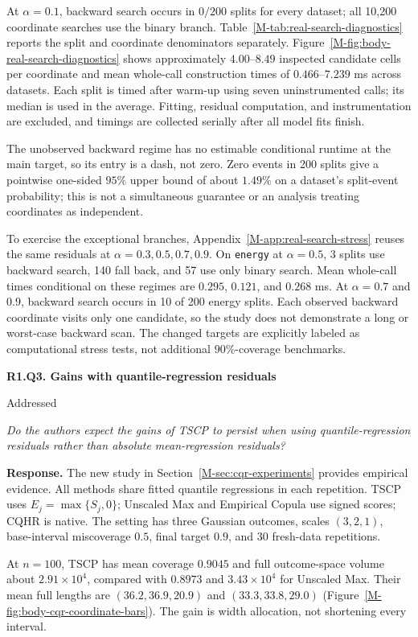\documentclass[11pt]{article}
\newcommand{\mssec}[1]{Section~\ref*{M-#1}}
\newcommand{\msapp}[1]{Appendix~\ref*{M-#1}}
\newcommand{\msfig}[1]{Figure~\ref*{M-#1}}
\newcommand{\mstab}[1]{Table~\ref*{M-#1}}
\newcommand{\point}[3]{\par\Needspace{7\baselineskip}\medskip
\noindent\parbox[t]{0.77\linewidth}{\textbf{#1}}\hfill
\parbox[t]{0.21\linewidth}{\raggedleft\small\sffamily #2}\par\nopagebreak
{\color{ReviewerBlue}\small\itshape #3\par}\textbf{Response.} }
\begin{document}
At $\alpha=0.1$, backward search occurs in $0/200$ splits for every dataset; all 10,200 coordinate searches use the binary branch. \mstab{tab:real-search-diagnostics} reports the split and coordinate denominators separately. \msfig{fig:body-real-search-diagnostics} shows approximately $4.00$--$8.49$ inspected candidate cells per coordinate and mean whole-call construction times of $0.466$--$7.239$ ms across datasets. Each split is timed after warm-up using seven uninstrumented calls; its median is used in the average. Fitting, residual computation, and instrumentation are excluded, and timings are collected serially after all model fits finish.

The unobserved backward regime has no estimable conditional runtime at the main target, so its entry is a dash, not zero. Zero events in 200 splits give a pointwise one-sided $95\%$ upper bound of about $1.49\%$ on a dataset's split-event probability; this is not a simultaneous guarantee or an analysis treating coordinates as independent.

To exercise the exceptional branches, \msapp{app:real-search-stress} reuses the same residuals at $\alpha=0.3,0.5,0.7,0.9$. On \texttt{energy} at $\alpha=0.5$, 3 splits use backward search, 140 fall back, and 57 use only binary search. Mean whole-call times conditional on these regimes are $0.295$, $0.121$, and $0.268$ ms. At $\alpha=0.7$ and $0.9$, backward search occurs in 10 of 200 energy splits. Each observed backward coordinate visits only one candidate, so the study does not demonstrate a long or worst-case backward scan. The changed targets are explicitly labeled as computational stress tests, not additional $90\%$-coverage benchmarks.

\point{R1.Q3. Gains with quantile-regression residuals}{Addressed}{Do the authors expect the gains of TSCP to persist when using
quantile-regression residuals rather than absolute mean-regression
residuals?}
\label{response:R1.Q3}
The new study in \mssec{sec:cqr-experiments} provides empirical evidence. All methods share fitted quantile regressions in each repetition. TSCP uses $E_j=\max\{S_j,0\}$; Unscaled Max and Empirical Copula use signed scores; CQHR is native. The setting has three Gaussian outcomes, scales $(3,2,1)$, base-interval miscoverage $0.5$, final target $0.9$, and 30 fresh-data repetitions.

At $n=100$, TSCP has mean coverage $0.9045$ and full outcome-space volume about $2.91\times10^4$, compared with $0.8973$ and $3.43\times10^4$ for Unscaled Max. Their mean full lengths are $(36.2,36.9,20.9)$ and $(33.3,33.8,29.0)$ (\msfig{fig:body-cqr-coordinate-bars}). The gain is width allocation, not shortening every interval.
\end{document}
